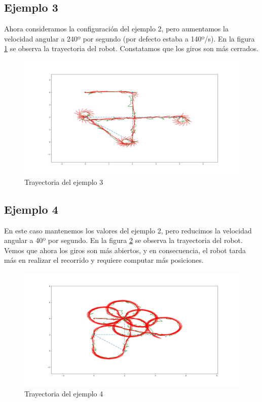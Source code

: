 \subsection{Ejemplo 3}
Ahora consideramos la configuración del ejemplo 2, pero aumentamos la velocidad angular a 240º por segundo (por defecto estaba a 140º/s). 
En la figura \ref{fig:localizacion_ej5} se observa la trayectoria del robot. Constatamos que los giros son más cerrados.

\begin{figure}[htb]
  \centering
  \includegraphics[width=1\linewidth]{images/localizacion11.png}
  \caption{Trayectoria del ejemplo 3}
  \label{fig:localizacion_ej5}
\end{figure}

\subsection{Ejemplo 4}
En este caso mantenemos los valores del ejemplo 2, pero reducimos la velocidad angular a 40º por segundo. 
En la figura \ref{fig:localizacion_ej6} se observa la trayectoria del robot. Vemos que ahora los giros son más abiertos, y en consecuencia, el robot tarda más
en realizar el recorrido y requiere computar más posiciones.

\begin{figure}[htb]
  \centering
  \includegraphics[width=1\linewidth]{images/localizacion12.png}
  \caption{Trayectoria del ejemplo 4}
  \label{fig:localizacion_ej6}
\end{figure}

